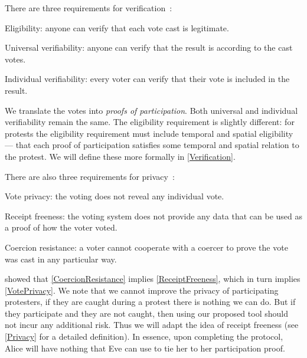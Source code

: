 There are three requirements for 
verification~\cite{VerifyingPrivacyPropertiesOfVotingProtocols}:
\begin{frame}
\begin{requirements}[V]
\item\label{EligibilityVerif} Eligibility: anyone can verify that each vote 
  cast is legitimate.
\item\label{UniversalVerif} Universal verifiability: anyone can verify that the 
  result is according to the cast votes.
\item\label{IndividualVerif} Individual verifiability: every voter can verify 
  that their vote is included in the result.
\end{requirements}
\end{frame}
We translate the votes into \emph{proofs of participation}.
Both universal and individual verifiability remain the same.
The eligibility requirement is slightly different:
for protests the eligibility requirement must include temporal and spatial 
eligibility --- that each proof of participation satisfies some temporal and 
spatial relation to the protest.
We will define these more formally in \cref{Verification}.

There are also three requirements for 
privacy~\cite{VerifyingPrivacyPropertiesOfVotingProtocols}:
\begin{frame}
\begin{requirements}[P]
\item\label{VotePrivacy} Vote privacy: the voting does not reveal any 
  individual vote.
\item\label{ReceiptFreeness} Receipt freeness: the voting system does not 
  provide any data that can be used as a proof of how the voter voted.
\item\label{CoercionResistance} Coercion resistance: a voter cannot cooperate 
  with a coercer to prove the vote was cast in any particular way.
\end{requirements}
\pause{}
\end{frame}
\Textcite{VerifyingPrivacyPropertiesOfVotingProtocols} showed that 
\cref{CoercionResistance} implies \cref{ReceiptFreeness}, which in turn implies
\cref{VotePrivacy}.
We note that we cannot improve the privacy of participating protesters, if they 
are caught during a protest there is nothing we can do.
But if they participate and they are not caught, then using our proposed tool 
should not incur any additional risk.
Thus we will adapt the idea of receipt freeness (see \cref{Privacy} for a 
detailed definition).
In essence, upon completing the protocol, Alice will have nothing that Eve can 
use to tie her to her participation proof.


